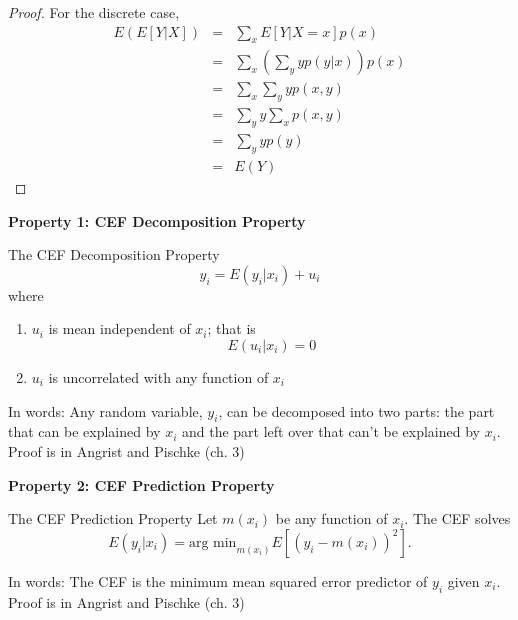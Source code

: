 \documentclass[notes=show]{beamer}
\begin{document}

\begin{frame}[plain]
	
	\begin{proof}
	For the discrete case,
		\begin{eqnarray*}
		E(E[Y|X]) &=& \sum_xE[Y|X=x]p(x) \\
		&=& \sum_x \left(\sum_y yp(y|x) \right)p(x) \\
		&=& \sum_x \sum_y yp(x,y) \\
		&=& \sum_y y \sum_x p(x,y) \\
		&=& \sum_y yp(y) \\
		&=& E(Y)
		\end{eqnarray*}
	\end{proof}
\end{frame}
	
\begin{frame}[plain]
	\begin{center}
	\textbf{Property 1: CEF Decomposition Property}
	\end{center}
	
	\begin{block}{The CEF Decomposition Property}
		$$y_i = E(y_i | x_i) + u_i$$where \begin{enumerate}
			\item $u_i$ is mean independent of $x_i$; that is$$E(u_i|x_i)=0$$
			\item $u_i$ is uncorrelated with any function of $x_i$
			\end{enumerate}
	\end{block}

In words:  Any random variable, $y_i$, can be decomposed into two parts:  the part that can be explained by $x_i$ and the part left over that can't be explained by $x_i$.  Proof is in Angrist and Pischke (ch. 3)
	
\end{frame}


		

\begin{frame}[plain]
	\begin{center}
	\textbf{Property 2: CEF Prediction Property}
	\end{center}
	
	\begin{block}{The CEF Prediction Property}
	Let $m(x_i)$ be any function of $x_i$. The CEF solves $$E(y_i|x_i) = \text{arg min}_{m(x_i)} E[(y_i - m(x_i))^2].$$  
	\end{block}
	
		In words: The CEF is the minimum mean squared error predictor of $y_i$ given $x_i$.  Proof is in Angrist and Pischke (ch. 3)
	\end{frame}
\end{document}
